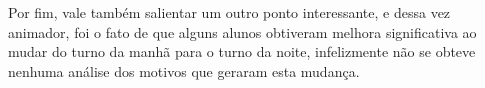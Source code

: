Por fim, vale também salientar um outro ponto interessante, e dessa vez animador, foi o fato de que alguns alunos obtiveram melhora significativa ao mudar do turno da manhã para o turno da noite, infelizmente não se obteve nenhuma análise dos motivos que geraram esta mudança.

